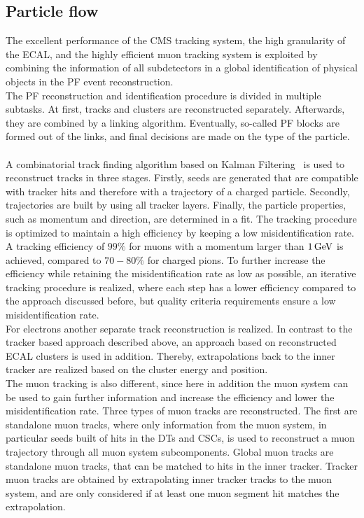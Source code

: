 \subsection{Particle flow}
The excellent performance of the CMS tracking system, the high granularity of the ECAL, and the highly efficient muon tracking system is exploited by combining the information of all subdetectors in a global identification of physical objects in the PF event reconstruction.\\
The PF reconstruction and identification procedure is divided in multiple subtasks. At first, tracks and clusters are reconstructed separately. Afterwards, they are combined by a linking algorithm. Eventually, so-called PF blocks are formed out of the links, and final decisions are made on the type of the particle.\\\\
A combinatorial track finding algorithm based on Kalman Filtering~\cite{Kalman} is used to reconstruct tracks in three stages. Firstly, seeds are generated that are compatible with tracker hits and therefore with a trajectory of a charged particle. Secondly, trajectories are built by using all tracker layers. Finally, the particle properties, such as momentum and direction, are determined in a fit. The tracking procedure is optimized to maintain a high efficiency by keeping a low misidentification rate. A tracking efficiency of $99\%$ for muons with a momentum larger than $1\,\text{Ge\hspace{-.08em}V}$ is achieved, compared to $70-80\%$ for charged pions. To further increase the efficiency while retaining the misidentification rate as low as possible, an iterative tracking procedure is realized, where each step has a lower efficiency compared to the approach discussed before, but quality criteria requirements ensure a low misidentification rate.\\
For electrons another separate track reconstruction is realized. In contrast to the tracker based approach described above, an approach based on reconstructed ECAL clusters is used in addition. Thereby, extrapolations back to the inner tracker are realized based on the cluster energy and position.\\
The muon tracking is also different, since here in addition the muon system can be used to gain further information and increase the efficiency and lower the misidentification rate. Three types of muon tracks are reconstructed. The first are standalone muon tracks, where only information from the muon system, in particular seeds built of hits in the DTs and CSCs, is used to reconstruct a muon trajectory through all muon system subcomponents. Global muon tracks are standalone muon tracks, that can be matched to hits in the inner tracker. Tracker muon tracks are obtained by extrapolating inner tracker tracks to the muon system, and are only considered if at least one muon segment hit matches the extrapolation.\\\\

